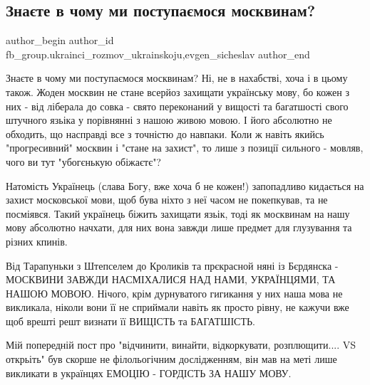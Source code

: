  
 
 
 
 
 
\subsection{Знаєте в чому ми поступаємося москвинам?}
\label{sec:26_10_2021.fb.fb_group.ukrainci_rozmov_ukrainskoju.1.moskvyny}
 
\ifcmt
 author_begin
   author_id fb_group.ukrainci_rozmov_ukrainskoju,evgen_sicheslav
 author_end
\fi

Знаєте в чому ми поступаємося москвинам? Ні, не в нахабстві, хоча і в цьому
також. Жоден москвин не стане всерйоз захищати українську мову, бо кожен з них
- від ліберала до совка - свято переконаний у вищості та багатшості свого
штучного язьіка у порівнянні з нашою живою мовою. І його абсолютно не обходить,
що насправді все з точністю до навпаки. Коли ж навіть якийсь "прогресивний"
москвин і "стане на захист", то лише з позиції сильного - мовляв, чого ви тут
"убогєнькую обіжаєтє"? 

Натомість Українець (слава Богу, вже хоча б не кожен!) запопадливо кидається на
захист московської мови, щоб бува ніхто з неї часом не покепкував, та не
посміявся. Такий українець біжить захищати язьік, тоді як москвинам на нашу
мову абсолютно начхати, для них вона завжди лише предмет для глузування та
різних кпинів.

Від Тарапуньки з Штепселем до Кроликів та прєкрасной няні із Бєрдянска -
МОСКВИНИ ЗАВЖДИ НАСМІХАЛИСЯ НАД НАМИ, УКРАЇНЦЯМИ, ТА НАШОЮ МОВОЮ. Нічого, крім
дурнуватого гигикання у них наша мова не викликала, ніколи вони її не сприймали
навіть як просто рівну, не кажучи вже щоб врешті решт визнати її ВИЩІСТЬ та
БАГАТШІСТЬ.

Мій попередній пост про "відчинити, винайти, відкоркувати, розплющити.... VS
открьіть" був скорше не філольогічним дослідженням, він мав на меті лише
викликати в українцях ЕМОЦІЮ - ГОРДІСТЬ ЗА НАШУ МОВУ.

